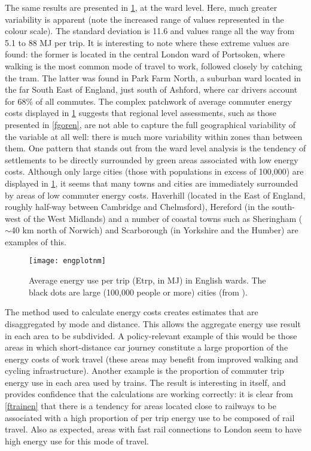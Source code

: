 The same results are presented in \cref{fengplotnm}, at the ward level.
Here, much greater variability is apparent (note the increased range of
values represented in the colour scale). The standard deviation is 11.6
and values range all the way from 5.1 to 88 MJ per trip.
It is interesting to note where these extreme values are found:
the former is located in the central London ward of
Portsoken, where walking is the most common mode of travel to work,
followed closely by catching the tram. The latter was
found in Park Farm North,
a suburban ward located in the far South East of England, just south of
Ashford, where car drivers account for 68\% of all commutes. The complex
patchwork of average  commuter energy costs displayed in \cref{fengplotnm}
suggests that regional level assessments, such as those
presented in \cref{fgoren}, are not able to capture the full geographical
variability of the variable at all well: there is much more variability
within zones than between them. One pattern that stands out from the ward level
analysis is the tendency of settlements to be directly surrounded by green areas
associated with low energy costs. Although only large cities (those with
populations in excess of 100,000) are displayed in
\cref{fengplotnm}, it seems that many towns and cities are immediately surrounded
by areas of low commuter energy costs. Haverhill (located in the East of
England, roughly half-way between Cambridge and Chelmsford),
Hereford (in the south-west of the West Midlands) and a number of coastal
towns such as  Sheringham ($\sim$40 km north of Norwich) and Scarborough
(in Yorkshire and the Humber) are examples of this.
\begin{figure}[htbp]
\begin{center}
    \texttt{[image: engplotnm]}  \end{center}
  \caption[Average energy use per trip (Etrp, in MJ) in English wards]
  {Average energy use per trip (Etrp, in MJ) in English wards.
  The black dots are large (100,000 people or more) cities (from
  \citet{Brownrigg2013}).}
 \label{fengplotnm}
\end{figure}

The method used to calculate energy costs creates estimates
that are disaggregated by mode and distance. This allows the
aggregate energy use result in each area to be subdivided.
A policy-relevant example of this would be those areas in which
short-distance car journey constitute
a large proportion of the energy costs of work travel (these areas
may benefit from improved walking and cycling infrastructure). Another example
is the proportion of commuter trip energy use
in each area used by trains. The result is interesting in itself, and
provides confidence that the calculations are working correctly:
it is clear from \cref{ftrainen} that there is a tendency for
areas located close to railways
to be associated with a high proportion of per trip energy
use to be composed of rail travel. Also as expected, areas with fast rail
connections to London seem to have high energy use for this mode of travel.

